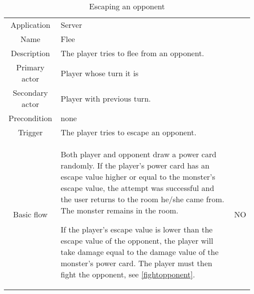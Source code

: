 \documentclass[a4paper,10pt]{report}
\begin{document}
\begin{table}
\caption{Escaping an opponent}
\label{escape}
\begin{tabular}{|c| p{9cm}|c}
\hline
Application & Server & \\
Name & Flee & \\
Description & The player tries to flee from an opponent. & \\
Primary actor & Player whose turn it is & \\
Secondary actor & Player with previous turn. & \\
Precondition & none & \\
Trigger & The player tries to escape an opponent. & \\ \hline
Basic flow & Both player and opponent draw a power card randomly. If the player's power card has an escape value higher or equal to the monster's escape value, the attempt was successful and the user returns to the room he/she came from. The monster remains in the room. 

If the player's escape value is lower than the escape value of the opponent, the player will take damage equal to the damage value of the monster's power card. The player must then fight the opponent, see \ref{fightopponent}.
& NO \\

\hline
\end{tabular}
\end{table}
\end{document}
